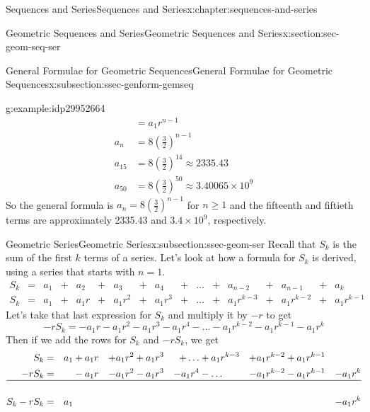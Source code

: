 \documentclass[twoside,10pt,]{book}
\numberwithin{equation}{section}
\newcommand{\amp}{&}
\begin{document}
\begin{chapterptx}{Sequences and Series}{}{Sequences and Series}{}{}{x:chapter:sequences-and-series}
\begin{sectionptx}{Geometric Sequences and Series}{}{Geometric Sequences and Series}{}{}{x:section:sec-geom-seq-ser}
\begin{subsectionptx}{General Formulae for Geometric Sequences}{}{General Formulae for Geometric Sequences}{}{}{x:subsection:ssec-genform-gemseq}
\begin{example}{}{g:example:idp29952664}
\begin{align*}
\amp = a_1 r^{n-1}\\
a_n \amp = 8\left(\frac{3}{2}\right)^{n-1}\\
a_{15}\amp = 8\left(\frac{3}{2}\right)^{14}\approx 2335.43\\
a_{50}\amp = 8\left(\frac{3}{2}\right)^{50}\approx 3.40065\times 10^9
\end{align*}
So the general formula is \(a_n = 8\left( \frac{3}{2} \right)^{n - 1}\) for \(n \ge 1\) and the fifteenth and fiftieth terms are approximately 2335.43 and \(3.4 \times 10^9\), respectively.\end{example}
%
\end{subsectionptx}
%
%
\typeout{************************************************}
\typeout{************************************************}
%
\begin{subsectionptx}{Geometric Series}{}{Geometric Series}{}{}{x:subsection:ssec-geom-ser}
Recall that \(S_k\) is the sum of the first \(k\) terms of a series.  Let's look at how a formula for \(S_k\) is derived, using a series that starts with \(n=1\).%
\begin{align*}
S_k \amp = \amp{a_1} \amp+ \amp{a_2} \amp+ \amp{a_3} \amp+ \amp{a_4} \amp+ \amp\ldots \amp+ \amp{a_{n - 2}} \amp+ \amp{a_{n - 1}} \amp+ \amp{a_k}\\
S_k \amp = \amp{a_1} \amp+ \amp{a_1}r \amp+ \amp{a_1}{r^2} \amp+ \amp{a_1}{r^3} \amp+ \amp\ldots \amp+ \amp{a_1}{r^{k - 3}} \amp+ \amp{a_1}{r^{k - 2}} \amp+ \amp{a_1}{r^{k - 1}}
\end{align*}
Let's take that last expression for \(S_k\) and multiply it by \(-r\) to get%
\begin{equation*}
- r{S_k} =  - {a_1}r - {a_1}{r^2} - {a_1}{r^3} - {a_1}{r^4} - ... - {a_1}{r^{k - 2}} - {a_1}{r^{k - 1}} - {a_1}{r^k}
\end{equation*}
Then if we add the rows for \(S_k\) and \(-rS_k\), we get%
\begin{align*}
{S_k} \amp= \amp {a_1} \amp+ {a_1}r \amp+ {a_1}{r^2} \amp+ {a_1}{r^3} \amp+ \ldots \amp+ {a_1}{r^{k - 3}} \amp+ {a_1}{r^{k - 2}} \amp+ {a_1}{r^{k - 1}}\\
- r{S_k} \amp=\amp\amp  - {a_1}r \amp- {a_1}{r^2} \amp- {a_1}{r^3} \amp- {a_1}{r^4} \amp- \ldots \amp- {a_1}{r^{k - 2}} \amp- {a_1}{r^{k - 1}} \amp- {a_1}{r^k}\\
\hline\\
{S_k} - r{S_k} \amp=\amp {a_1} \amp\amp\amp\amp\amp\amp\amp\amp- {a_1}{r^k}
\end{align*}

\end{subsectionptx}
\end{sectionptx}
\end{chapterptx}
\end{document}
